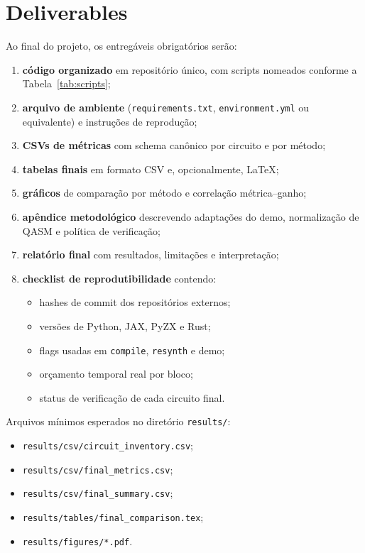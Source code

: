 \documentclass[a4paper,11pt]{article}
\begin{document}
\section{Deliverables}

Ao final do projeto, os entregáveis obrigatórios serão:

\begin{enumerate}
  \item \textbf{código organizado} em repositório único, com scripts nomeados conforme a Tabela~\ref{tab:scripts};
  \item \textbf{arquivo de ambiente} (\texttt{requirements.txt}, \texttt{environment.yml} ou equivalente) e instruções de reprodução;
  \item \textbf{CSVs de métricas} com schema canônico por circuito e por método;
  \item \textbf{tabelas finais} em formato CSV e, opcionalmente, \LaTeX;
  \item \textbf{gráficos} de comparação por método e correlação métrica--ganho;
  \item \textbf{apêndice metodológico} descrevendo adaptações do demo, normalização de QASM e política de verificação;
  \item \textbf{relatório final} com resultados, limitações e interpretação;
  \item \textbf{checklist de reprodutibilidade} contendo:
  \begin{itemize}
    \item hashes de commit dos repositórios externos;
    \item versões de Python, JAX, PyZX e Rust;
    \item flags usadas em \texttt{compile}, \texttt{resynth} e demo;
    \item orçamento temporal real por bloco;
    \item status de verificação de cada circuito final.
  \end{itemize}
\end{enumerate}

Arquivos mínimos esperados no diretório \texttt{results/}:
\begin{itemize}
  \item \texttt{results/csv/circuit\_inventory.csv};
  \item \texttt{results/csv/final\_metrics.csv};
  \item \texttt{results/csv/final\_summary.csv};
  \item \texttt{results/tables/final\_comparison.tex};
  \item \texttt{results/figures/*.pdf}.
\end{itemize}
\end{document}
